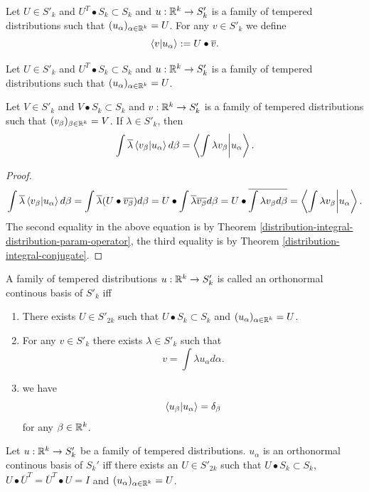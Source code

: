 \documentclass[main.tex]{subfiles}
\begin{document}
\begin{definition}
Let $U\in S'_k$ and $U^T \bullet S_k \subset S_k$ and $u:\mathbb{R}^k\to S'_k$ is a family of tempered distributions such that $(u_\alpha)_{\alpha\in\mathbb{R}^k} = U$. For any $v\in S'_k$ we define
\begin{equation}
\braket{v}{u_\alpha} := U \bullet \overline{v}.
\end{equation}
\begin{theorem}
Let $U\in S'_k$ and $U^T \bullet S_k \subset S_k$ and $u:\mathbb{R}^k\to S'_k$ is a family of tempered distributions such that $(u_\alpha)_{\alpha\in\mathbb{R}^k} = U$.

Let $V\in S'_k$ and $V \bullet S_k \subset S_k$ and $v:\mathbb{R}^k\to S'_k$ is a family of tempered distributions such that $(v_\beta)_{\beta\in\mathbb{R}^k} = V$. If $\lambda\in S'_k$, then
\begin{equation}
\int \overline{\lambda}\braket{v_\beta}{u_\alpha} d\beta = \braket{\int\lambda v_\beta}{u_\alpha}. 
\end{equation}
\end{theorem}
\begin{proof}
\begin{equation}
\int \overline{\lambda}\braket{v_\beta}{u_\alpha} d\beta = \int \overline{\lambda}(U\bullet \overline{v_\beta}) d\beta = U \bullet \int 
\overline{\lambda} \overline{v_\beta} d\beta = U \bullet \overline{\int 
\lambda v_\beta d\beta} = \braket{\int\lambda v_\beta}{u_\alpha}.
\end{equation}
The second equality in the above equation is by Theorem \ref{distribution-integral-distribution-param-operator}, the third equality is by Theorem \ref{distribution-integral-conjugate}.
\end{proof}

\end{definition}
\begin{definition}
A family of tempered distributions $u:\mathbb{R}^k\to S'_k$ is called an orthonormal continous basis of $S'_k$
iff
\begin{enumerate}
\item There exists $U\in S'_{2k}$ such that $U\bullet S_k \subset S_k$ and $(u_\alpha)_{\alpha\in\mathbb{R}^k} = U$.
\item For any $v\in S'_k$ there exists $\lambda\in S'_k$ such that 
\begin{equation}
v = \int \lambda u_\alpha d\alpha.
\end{equation}
\item we have
\begin{equation}
\braket{u_\beta}{u_\alpha} = \delta_\beta
\end{equation} 
for any $\beta\in\mathbb{R}^k$.
\end{enumerate}
\end{definition}
\begin{theorem}
Let $u:\mathbb{R}^k\to S_k'$ be a family of tempered distributions.
$u_\alpha$ is an orthonormal continous basis of $S_k'$
iff
there exists an $U\in S'_{2k}$ such that $U\bullet S_k \subset S_k$, $U \bullet \overline{U}^T = \overline{U}^T \bullet U = I$ and $(u_\alpha)_{\alpha\in\mathbb{R}^k} = U$.
\end{theorem}
\end{document}
